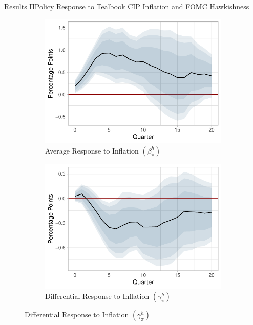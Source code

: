 \documentclass[11pt,pdf,aspectratio=129]{beamer}
\begin{document}
\begin{frame}{Results II}{Policy Response to Tealbook CIP Inflation and FOMC Hawkishness}

    \begin{figure}[!htbp]\centering
        \label{fig:LP2}
        \begin{subfigure}[b]{0.48\textwidth}
            \centering
            \caption{Average Response to Inflation $\left(\beta_\pi^h\right)$}
            \label{fig:average_inflation}
            \includegraphics[width=\linewidth]{average_cpi_inflation_shorter.pdf}
        \end{subfigure}
        \hfill
        \begin{subfigure}[b]{0.48\textwidth}
            \centering 
            \caption{Differential Response to Inflation $\left(\gamma_\pi^h\right)$}
            \label{fig:differential_inflation}
            \includegraphics[width=\linewidth]{differential_cpi_inflation_shorter.pdf}

\end{subfigure}
\end{figure}
\end{frame}
\end{document}

